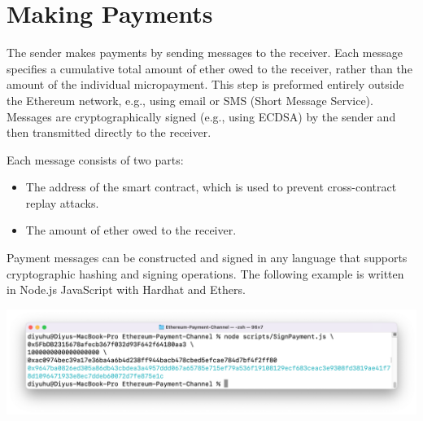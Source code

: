 \section{Making Payments}\label{sec:making-payments}
The sender makes payments by sending messages to the receiver.
Each message specifies a cumulative total amount of ether owed to the receiver, rather than the amount of the individual
micropayment.
This step is preformed entirely outside the Ethereum network, e.g., using email or SMS (Short Message Service).
Messages are cryptographically signed (e.g., using ECDSA) by the sender and then transmitted directly to the receiver.

Each message consists of two parts:
\begin{itemize}
    \item The address of the smart contract, which is used to prevent cross-contract replay attacks.
    \item The amount of ether owed to the receiver.
\end{itemize}

Payment messages can be constructed and signed in any language that supports cryptographic hashing and signing
operations.
The following example is written in Node.js JavaScript with Hardhat and Ethers.



\includegraphics[width=\textwidth]{./images/sign-message-example}
